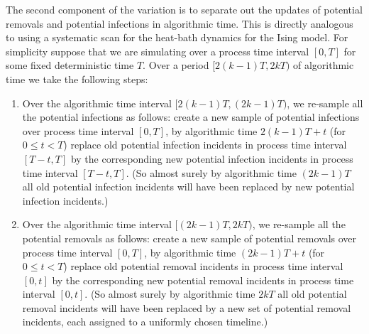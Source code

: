 \documentclass[]{article}
\begin{document}
 The second component of the variation is to separate out the updates of potential removals and potential infections in algorithmic time.
 This is directly analogous to using a systematic scan for the heat-bath dynamics for the Ising model.%
 For simplicity suppose that we are simulating over a process time interval \([0,T]\) for some fixed deterministic time \(T\).
 Over a period \([2(k-1)T, 2kT)\) of algorithmic time we take the following steps:%
\begin{enumerate}
  \item Over the algorithmic time interval \([2(k-1)T, (2k-1)T)\),%
we re-sample all the potential infections as follows: create a new sample of potential infections over process time interval \([0,T]\),
 by algorithmic time \(2(k-1)T+t\) (for \(0\leq t< T\))
 replace old potential infection incidents in process time interval \([T-t,T]\) by the corresponding new potential infection incidents in process time interval \([T-t,T]\).
 (So almost surely by algorithmic time \((2k-1)T\) all old potential infection incidents will have been replaced by new potential infection incidents.)
\item Over the algorithmic time interval \([(2k-1)T, 2kT)\),%
we re-sample all the potential removals as follows: create a new sample of potential removals over process time interval \([0,T]\),
by algorithmic time \((2k-1)T+t\) (for \(0\leq t<T\))
replace old potential removal incidents in process time interval \([0,t]\) by the corresponding new potential removal incidents in process time interval \([0,t]\).
(So almost surely by algorithmic time \(2kT\) all old potential
removal incidents will have been replaced by a new set of potential
removal incidents, each assigned to a uniformly chosen timeline.)
\end{enumerate}
\end{document}
